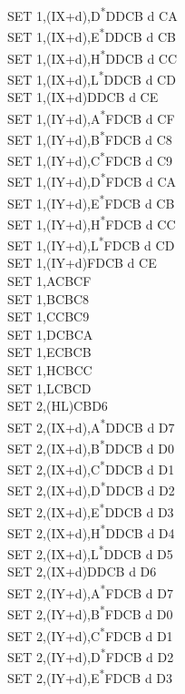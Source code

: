 \documentclass[oneside,a4paper]{book}
\begin{document}
\begin{multicols}{3}
{\begin{tabbing}
SET 1,(IX+d),D\textsuperscript{*}\>DDCB d CA\\
SET 1,(IX+d),E\textsuperscript{*}\>DDCB d CB\\
SET 1,(IX+d),H\textsuperscript{*}\>DDCB d CC\\
SET 1,(IX+d),L\textsuperscript{*}\>DDCB d CD\\
SET 1,(IX+d)\>DDCB d CE\\
SET 1,(IY+d),A\textsuperscript{*}\>FDCB d CF\\
SET 1,(IY+d),B\textsuperscript{*}\>FDCB d C8\\
SET 1,(IY+d),C\textsuperscript{*}\>FDCB d C9\\
SET 1,(IY+d),D\textsuperscript{*}\>FDCB d CA\\
SET 1,(IY+d),E\textsuperscript{*}\>FDCB d CB\\
SET 1,(IY+d),H\textsuperscript{*}\>FDCB d CC\\
SET 1,(IY+d),L\textsuperscript{*}\>FDCB d CD\\
SET 1,(IY+d)\>FDCB d CE\\
SET 1,A\>CBCF\\
SET 1,B\>CBC8\\
SET 1,C\>CBC9\\
SET 1,D\>CBCA\\
SET 1,E\>CBCB\\
SET 1,H\>CBCC\\
SET 1,L\>CBCD\\
SET 2,(HL)\>CBD6\\
SET 2,(IX+d),A\textsuperscript{*}\>DDCB d D7\\
SET 2,(IX+d),B\textsuperscript{*}\>DDCB d D0\\
SET 2,(IX+d),C\textsuperscript{*}\>DDCB d D1\\
SET 2,(IX+d),D\textsuperscript{*}\>DDCB d D2\\
SET 2,(IX+d),E\textsuperscript{*}\>DDCB d D3\\
SET 2,(IX+d),H\textsuperscript{*}\>DDCB d D4\\
SET 2,(IX+d),L\textsuperscript{*}\>DDCB d D5\\
SET 2,(IX+d)\>DDCB d D6\\
SET 2,(IY+d),A\textsuperscript{*}\>FDCB d D7\\
SET 2,(IY+d),B\textsuperscript{*}\>FDCB d D0\\
SET 2,(IY+d),C\textsuperscript{*}\>FDCB d D1\\
SET 2,(IY+d),D\textsuperscript{*}\>FDCB d D2\\
SET 2,(IY+d),E\textsuperscript{*}\>FDCB d D3\\

\end{tabbing}}
\end{multicols}
\end{document}
